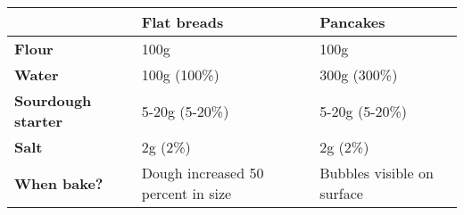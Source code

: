 


\begin{tabular}{|l|l|l|}
\hline
                           & \textbf{Flat breads} & \textbf{Pancakes}                        \\ \hline
\textbf{Flour}             & 100g                               & 100g                       \\ \hline
\textbf{Water}             & 100g (100\%)                       & 300g (300\%)               \\ \hline
\textbf{Sourdough starter} & 5-20g (5-20\%)                     & 5-20g (5-20\%)             \\ \hline
\textbf{Salt}              & 2g (2\%)                           & 2g (2\%)                   \\ \hline
\textbf{When bake?}        & Dough increased 50 percent in size & Bubbles visible on surface \\ \hline
\end{tabular}

